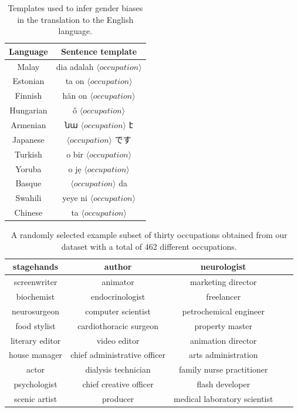 \documentclass{article}
\begin{document}
\begin{table}[H]
	\centering
	\begin{tabular}{|c|c|}
	\hline
	Language 	& Sentence template \\ \hline \hline
	Malay		& dia adalah $\langle occupation \rangle$ \\ \hline
	Estonian	& ta on $\langle occupation \rangle$ \\ \hline
	Finnish		& hän on $\langle occupation \rangle$ \\ \hline
	Hungarian	& ő $\langle occupation \rangle$ \\ \hline
	Armenian	& նա $\langle occupation \rangle$ է \\ \hline
	Japanese	& $\langle occupation \rangle$ です\\ \hline
	Turkish		& o bir $\langle occupation \rangle$ \\ \hline
	Yoruba		& o jẹ $\langle occupation \rangle$ \\ \hline
	Basque		& $\langle occupation \rangle$ da \\ \hline
	Swahili		& yeye ni $\langle occupation \rangle$ \\ \hline
	Chinese		& ta $\langle occupation \rangle$ \\ \hline
	\end{tabular}
	\caption{Templates used to infer gender biases in the translation to the English language.}
	\label{tab:templates}
\end{table}

\begin{table}[H]
	\centering
	\begin{tabular}{|c|c|c|c|c|}
	\hline
	stagehands & author & neurologist \\ \hline
	screenwriter & animator & marketing director \\ \hline
	biochemist & endocrinologist & freelancer \\ \hline
	neurosurgeon & computer scientist & petrochemical engineer \\ \hline
	food stylist & cardiothoracic surgeon & property master \\ \hline
	literary editor & video editor & animation director \\ \hline
	house manager & chief administrative officer & arts administration \\ \hline
	actor & dialysis technician & family nurse practitioner \\ \hline
	psychologist & chief creative officer & flash developer \\ \hline
	scenic artist & producer & medical laboratory scientist \\ \hline
	\end{tabular}
	\caption{A randomly selected example subset of thirty occupations obtained from our dataset with a total of 462 different occupations.}
	\label{tab:occupations-examples}
\end{table}
\end{document}
